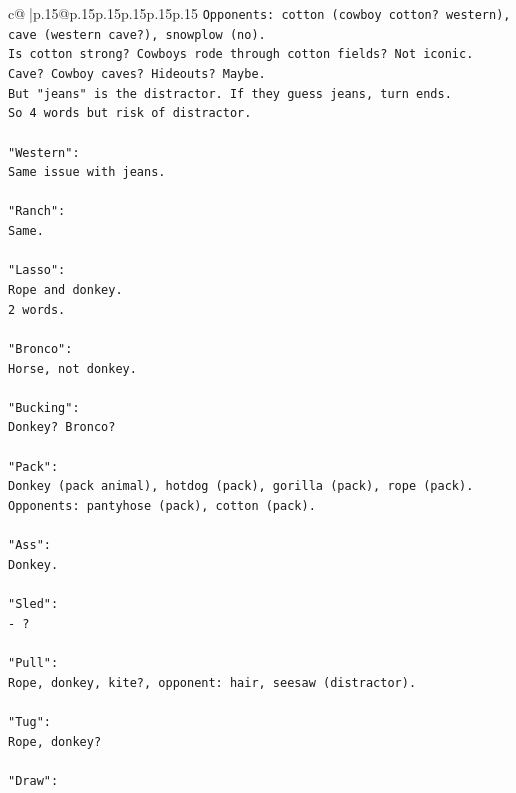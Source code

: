 \documentclass{article}
\begin{document}
{\begin{supertabular}{c@{$\;$}|p{.15\linewidth}@{}p{.15\linewidth}p{.15\linewidth}p{.15\linewidth}p{.15\linewidth}p{.15\linewidth}}
{{{\texttt{Opponents: cotton (cowboy cotton? western), cave (western cave?), snowplow (no).} \\
\texttt{Is cotton strong? Cowboys rode through cotton fields? Not iconic.} \\
\texttt{Cave? Cowboy caves? Hideouts? Maybe.} \\
\texttt{But "jeans" is the distractor. If they guess jeans, turn ends.} \\
\texttt{So 4 words but risk of distractor.} \\
\\ 
\texttt{"Western":} \\
\texttt{Same issue with jeans.} \\
\\ 
\texttt{"Ranch":} \\
\texttt{Same.} \\
\\ 
\texttt{"Lasso":} \\
\texttt{Rope and donkey.} \\
\texttt{2 words.} \\
\\ 
\texttt{"Bronco":} \\
\texttt{Horse, not donkey.} \\
\\ 
\texttt{"Bucking":} \\
\texttt{Donkey? Bronco?} \\
\\ 
\texttt{"Pack":} \\
\texttt{Donkey (pack animal), hotdog (pack), gorilla (pack), rope (pack).} \\
\texttt{Opponents: pantyhose (pack), cotton (pack).} \\
\\ 
\texttt{"Ass":} \\
\texttt{Donkey.} \\
\\ 
\texttt{"Sled":} \\
\texttt{{-} ?} \\
\\ 
\texttt{"Pull":} \\
\texttt{Rope, donkey, kite?, opponent: hair, seesaw (distractor).} \\
\\ 
\texttt{"Tug":} \\
\texttt{Rope, donkey?} \\
\\ 
\texttt{"Draw":} \\
}}}
\end{supertabular}}
\end{document}
